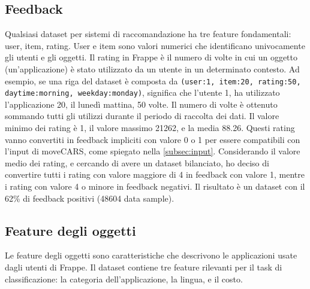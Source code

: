 \documentclass[12pt,italian]{report}
\begin{document}
\subsection{Feedback}
Qualsiasi dataset per sistemi di raccomandazione ha tre feature fondamentali: user, item, rating. User e item sono valori numerici che identificano univocamente gli utenti e gli oggetti. Il rating in Frappe è il numero di volte in cui un oggetto (un'applicazione) è stato utilizzato da un utente in un determinato contesto. Ad esempio, se una riga del dataset è composta da \texttt{(user:1, item:20, rating:50, daytime:morning, weekday:monday)}, significa che l'utente 1, ha utilizzato l'applicazione 20, il lunedì mattina, 50 volte. Il numero di volte è ottenuto sommando tutti gli utilizzi durante il periodo di raccolta dei dati. Il valore minimo dei rating è 1, il valore massimo 21262, e la media 88.26. Questi rating vanno convertiti in feedback impliciti con valore 0 o 1 per essere compatibili con l'input di moveCARS, come spiegato nella \autoref{subsec:input}. Considerando il valore medio dei rating, e cercando di avere un dataset bilanciato, ho deciso di convertire tutti i rating con valore maggiore di 4 in feedback con valore 1, mentre i rating con valore 4 o minore in feedback negativi. Il risultato è un dataset con il 62\% di feedback positivi (48604 data sample).

\subsection{Feature degli oggetti}
Le feature degli oggetti sono caratteristiche che descrivono le applicazioni usate dagli utenti di Frappe. Il dataset contiene tre feature rilevanti per il task di classificazione: la categoria dell'applicazione, la lingua, e il costo.
\end{document}
